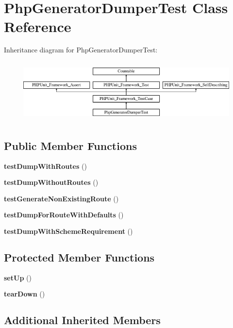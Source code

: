 \section{Php\+Generator\+Dumper\+Test Class Reference}
\label{class_symfony_1_1_component_1_1_routing_1_1_tests_1_1_generator_1_1_dumper_1_1_php_generator_dumper_test}
Inheritance diagram for Php\+Generator\+Dumper\+Test\+:\begin{figure}[H]
\begin{center}
\leavevmode
\includegraphics[height=3.303835cm]{class_symfony_1_1_component_1_1_routing_1_1_tests_1_1_generator_1_1_dumper_1_1_php_generator_dumper_test}
\end{center}
\end{figure}
\subsection*{Public Member Functions}
\begin{DoxyCompactItemize}
\item 
{\bf test\+Dump\+With\+Routes} ()
\item 
{\bf test\+Dump\+Without\+Routes} ()
\item 
{\bf test\+Generate\+Non\+Existing\+Route} ()
\item 
{\bf test\+Dump\+For\+Route\+With\+Defaults} ()
\item 
{\bf test\+Dump\+With\+Scheme\+Requirement} ()
\end{DoxyCompactItemize}
\subsection*{Protected Member Functions}
\begin{DoxyCompactItemize}
\item 
{\bf set\+Up} ()
\item 
{\bf tear\+Down} ()
\end{DoxyCompactItemize}
\subsection*{Additional Inherited Members}


